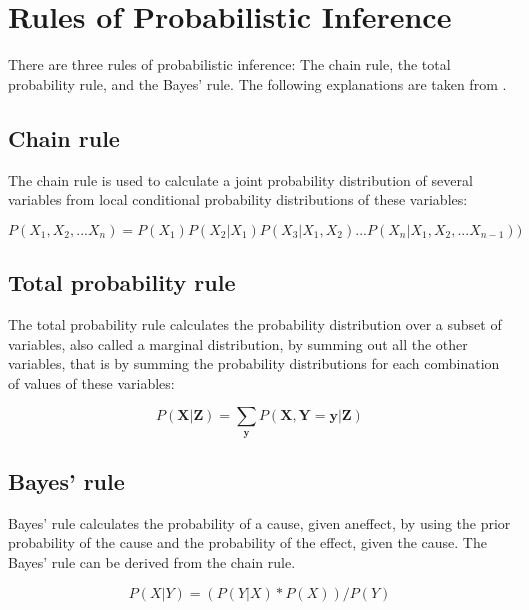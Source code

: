 \documentclass{article}
\begin{document}
\tableofcontents


\printglossaries
\section{Rules of Probabilistic Inference}

There are three rules of probabilistic inference: The chain rule, the total probability rule, and the Bayes' rule. The following explanations are taken from \cite{9781617292330}.

\subsection{Chain rule}

The chain rule is used to calculate a \gls{joint probability distribution} of several variables from local \gls{conditional probability distribution}s of these variables:

\begin{equation}
  P(X_1 ,X_2 ,...X_n ) = P(X_1 )P(X_2 | X_1 )P(X_3 | X_1 ,X_2 )...P(X_n | X_1 ,X_2 ,...X_{n-1}) )
\end{equation}

\subsection{Total probability rule}

The total probability rule calculates the probability distribution over a subset of variables, also called a \gls{marginal distribution}, by summing out all the other variables, that is by summing the probability distributions for each combination of values of these variables:

\begin{equation}
P(\boldsymbol X |\boldsymbol Z ) = \sum_{\boldsymbol y}   P(\boldsymbol X ,\boldsymbol Y =\boldsymbol y |\boldsymbol Z )
\end{equation} 

\subsection{Bayes' rule}

Bayes' rule calculates the probability of a cause, given aneffect, by using the prior probability of the cause and the probability of the effect, given the cause. The Bayes' rule can be derived from the chain rule.

\begin{equation}
P(X|Y) = ( P(Y|X) * P(X) ) / P(Y)
\end{equation}
\end{document}
